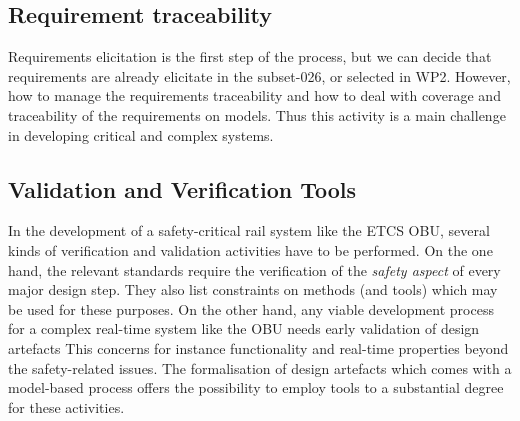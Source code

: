 \documentclass{template/openetcs_article}
\begin{document}
\subsection{Requirement traceability}

Requirements elicitation is the first step of the process, but we can decide that requirements are already elicitate in the subset-026, or selected in WP2. However, how to manage the requirements traceability and how to deal with coverage and traceability of the requirements on models. Thus this activity is a main challenge in developing critical and complex systems.




\subsection{Validation and Verification Tools}

In the development of a safety-critical rail system like the ETCS OBU,
several kinds of verification and validation activities have to be
performed. On the one hand, the relevant standards require the
verification of the \emph{safety aspect} of every major design
step. They also list constraints on methods (and tools) which may be used for these
purposes.  On the other hand, any viable development process for a
complex real-time system like the OBU needs early validation of design
artefacts This concerns for instance functionality and real-time
properties beyond the safety-related issues. The formalisation of
design artefacts which comes with a model-based process offers the
possibility to employ tools to a substantial degree for these
activities. 
\end{document}
